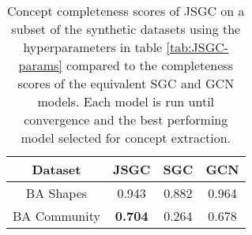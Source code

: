 \begin{table}
    \centering
    \begin{tabular}{c|c|cc}
        \textbf{Dataset} &
        \textbf{JSGC} &
        \textbf{SGC} &
        \textbf{GCN} \\
        \midrule
        BA Shapes       & 0.943 & 0.882 & 0.964 \\
        BA Community    & \textbf{0.704} & 0.264 & 0.678 \\
    \end{tabular}
    \caption{Concept completeness scores of JSGC on a subset of the synthetic datasets using the hyperparameters in table \ref{tab:JSGC-params} compared to the completeness scores of the equivalent SGC and GCN models. Each model is run until convergence and the best performing model selected for concept extraction.}
    \label{tab:JSGC-completeness}
\end{table}

